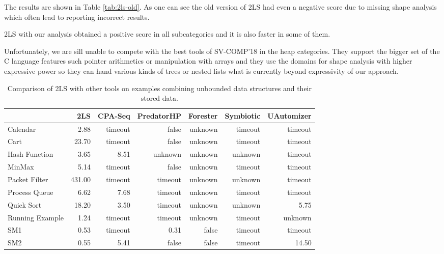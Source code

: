 {The results are shown in Table \ref{tab:2ls-old}.
As one can see the old version of 2LS had even a negative score due to
missing shape analysis which often lead to reporting incorrect results.
 
2LS with our analysis obtained a positive score in all subcategories and it is
also faster in some of them.

Unfortunately, we are sill unable to compete with the best tools of SV-COMP'18 in the heap categories.
They support the bigger set of the C language features such pointer arithmetics or
manipulation with arrays and they use the domains for shape analysis with higher expressive power
so they can hand various kinds of trees or nested lists what is currently beyond expressivity
of our approach.

\begin{table}[t]
\captionsetup{font=small}
\caption{Comparison of 2LS with other tools on examples combining unbounded data structures and their stored data.}
\vspace*{-1mm}
\label{tab:others}
\centering
\scriptsize
\bgroup
\def\arraystretch{1.2}
\begin{tabular}{|l| g | r | r | r | r | r |}
\hline
& \textbf{2LS}  & \textbf{CPA-Seq } & \textbf{PredatorHP} & \textbf{Forester}  & \textbf{Symbiotic} & \textbf{UAutomizer}  \\\hline
Calendar          & 2.88   & timeout & false   & unknown  & timeout  & timeout  \\\hline
Cart              & 23.70  & timeout & false   & unknown  & timeout  & timeout  \\\hline
Hash Function     & 3.65   & 8.51    & unknown & unknown  & unknown  & timeout  \\\hline
MinMax            & 5.14   & timeout & false   & unknown  & timeout  & timeout  \\\hline
Packet Filter     & 431.00 & timeout & timeout & unknown  & unknown  & timeout  \\\hline
Process Queue     & 6.62   & 7.68    & timeout & unknown  & timeout  & timeout  \\\hline
Quick Sort        & 18.20  & 3.50    & timeout & unknown  & unknown  & 5.75     \\\hline
Running Example   & 1.24   & timeout & timeout & unknown  & timeout  & unknown  \\\hline
SM1               & 0.53   & timeout & 0.31    & false    & timeout  & timeout  \\\hline
SM2               & 0.55   & 5.41    & false   & false    & timeout  & 14.50    \\\hline
\end{tabular}
\egroup
\vspace{-1.5em}
\end{table}

}
